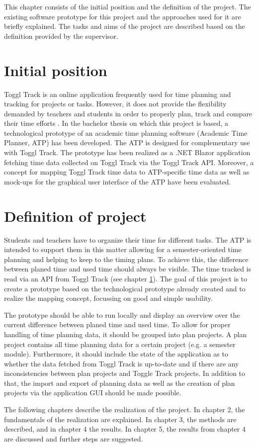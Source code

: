 
This chapter consists of the initial position and the definition of the project. The existing software prototype for this project and the approaches used for it are briefly explained. The tasks and aims of the project are described based on the definition provided by the supervisor.

\section{Initial position} \label{Initial position}
Toggl Track \cite{toggl_track_url} is an online application frequently used for time planning and tracking for projects or tasks. However, it does not provide the flexibility demanded by teachers and students in order to properly plan, track and compare their time efforts \cite{bachelorarbeit_Egger_Verstappen_page2}. In the bachelor thesis \cite{bachelorarbeit_Egger_Verstappen_page1} on which this project is based, a technological prototype of an academic time planning software (Academic Time Planner, ATP) has been developed. The ATP is designed for complementary use with Toggl Track. The prototype has been realized as a .NET Blazor application fetching time data collected on Toggl Track via the Toggl Track API. Moreover, a concept for mapping Toggl Track time data to ATP-specific time data as well as mock-ups for the graphical user interface of the ATP have been evaluated.

\section{Definition of project} \label{Definition}
Students and teachers have to organize their time for different tasks. The ATP is intended to support them in this matter allowing for a semester-oriented time planning and helping to keep to the timing plans. To achieve this, the difference between planed time and used time should always be visible. The time tracked is read via an API from Toggl Track (see chapter \ref{Initial position}). The goal of this project is to create a prototype based on the technological prototype already created and to realize the mapping concept, focussing on good and simple usability.

The prototype should be able to run locally and display an overview over the current difference between planed time and used time. To allow for proper handling of time planning data, it should be grouped into plan projects. A plan project contains all time planning data for a certain project (e.g. a semester module). Furthermore, it should include the state of the application as to whether the data fetched from Toggl Track is up-to-date and if there are any inconsistencies between plan projects and Toggle Track projects. In addition to that, the import and export of planning data as well as the creation of plan projects via the application GUI should be made possible.

The following chapters describe the realization of the project. In chapter 2, the fundamentals of the realization are explained. In chapter 3, the methods are described, and in chapter 4 the results. In chapter 5, the results from chapter 4 are discussed and further steps are suggested.
 


